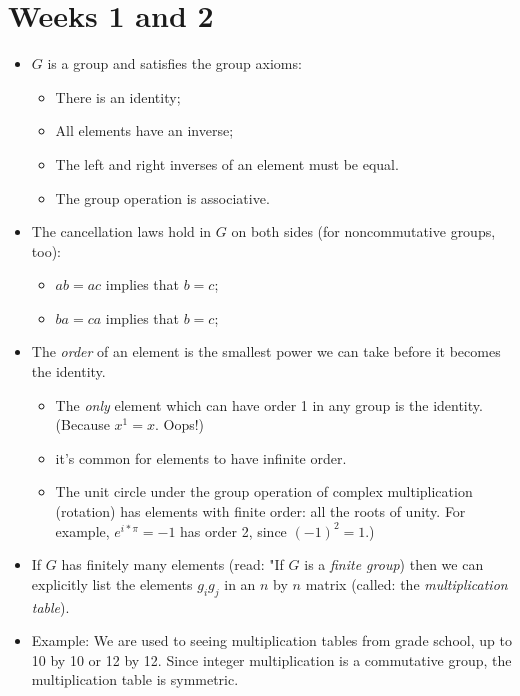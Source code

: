 \documentclass[1    0pt, answers]{exam} \renewcommand{\baselinestretch}{1.05}
\theoremstyle{plain}
\theoremstyle{definition}
\begin{document}
\unframedsolutions

\section{Weeks 1 and 2}

\begin{questions}

\begin{itemize}
    \item $G$ is a group and satisfies the group axioms:
    
    \begin{itemize}
        \item There is an identity;
        \item All elements have an inverse;
        \item The left and right inverses of an element must be equal.
        \item The group operation is associative.
    \end{itemize}
    
    \item The cancellation laws hold in $G$ on both sides (for noncommutative groups, too):
    \begin{itemize}
        \item $ab = ac$ implies that $b = c$;
        \item $ba = ca$ implies that $b = c$;
    \end{itemize}
    \item The \emph{order} of an element is the smallest power we can take before it becomes the identity.
    \begin{itemize}
        \item The \emph{only} element which can have order 1 in any group is the identity. (Because $x^1 = x$. Oops!)
        \item it's common for elements to have infinite order.
        \item The unit circle under the group operation of complex multiplication (rotation) has elements with finite order: all the roots of unity. For example, $e^{i*\pi} = -1$ has order 2, since $(-1)^2 = 1$.)
    \end{itemize}
    \item If $G$ has finitely many elements (read: "If $G$ is a \emph{finite group}) then we can explicitly list the elements $g_ig_j$ in an $n$ by $n$ matrix (called: the \emph{multiplication table}).
    \item Example: We are used to seeing multiplication tables from grade school, up to 10 by 10 or 12 by 12. Since integer multiplication is a commutative group, the multiplication table is symmetric.
\end{itemize}


\end{questions}
\end{document}
